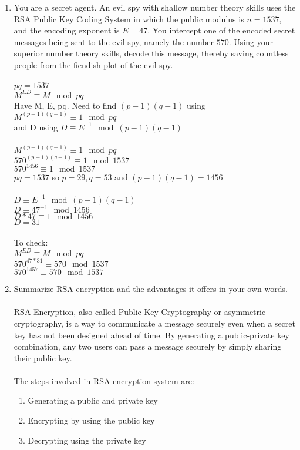 \documentclass[]{article}
\begin{document}
\begin{enumerate}
    \item You are a secret agent. An evil spy with shallow number theory skills uses the RSA Public Key Coding System in which the public modulus is $n=1537$, and the encoding exponent is $E=47$. You intercept one of the encoded secret messages being sent to the evil spy, namely the number $570$. Using your superior number theory skills, decode this message, thereby saving countless people from the fiendish plot of the evil spy.
    \\\\$pq=1537$
    \\$M^{ED} \equiv M \mod pq$
    \\Have M, E, pq. Need to find $(p-1)(q-1)$ using $M^{(p-1)(q-1)} \equiv 1 \mod pq$
    \\and D using $D \equiv E^{-1} \mod (p-1)(q-1)$
    \\\\$M^{(p-1)(q-1)} \equiv 1 \mod pq$
    \\$570^{(p-1)(q-1)} \equiv 1 \mod 1537$
    \\$570^{1456} \equiv 1 \mod 1537$
    \\$pq=1537$ so $p=29,q=53$ and $(p-1)(q-1)=1456$
    \\\\$D \equiv E^{-1} \mod (p-1)(q-1)$
    \\$D \equiv 47^{-1} \mod 1456$
    \\$D * 47 \equiv 1 \mod 1456$
    \\$D=31$
    \\\\To check:
    \\$M^{ED} \equiv M \mod pq$
    \\$570^{47*31} \equiv 570 \mod 1537$
    \\$570^{1457} \equiv 570 \mod 1537$
    \item Summarize RSA encryption and the advantages it offers in your own words.
    \\\\RSA Encryption, also called Public Key Cryptography or asymmetric cryptography, is a way to communicate a message securely even when a secret key has not been designed ahead of time. By generating a public-private key combination, any two users can pass a message securely by simply sharing their public key. 
    \\\\The steps involved in RSA encryption system are:
    \begin{enumerate}
        \item Generating a public and private key
        \item Encrypting by using the public key
        \item Decrypting using the private key 


\end{enumerate}
\end{enumerate}
\end{document}
